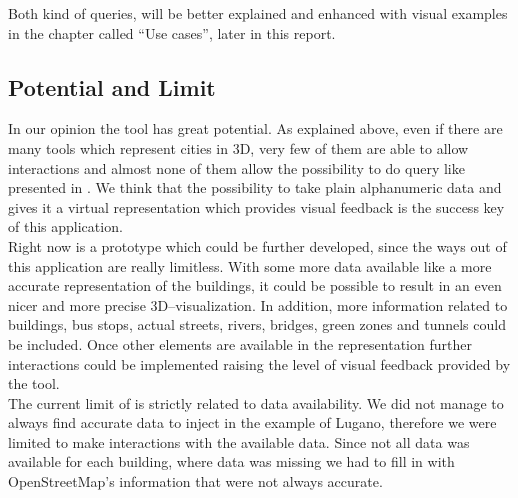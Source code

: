Both kind of queries, will be better explained and enhanced with visual examples in the chapter called ``Use cases'', later in this report. 
\subsection{Potential and Limit}
In our opinion the tool has great potential. As explained above, even if there are many tools which represent cities in 3D, very few of them are able to allow interactions and almost none of them allow the possibility to do query like presented in \applicationName. We think that the possibility to take plain alphanumeric data and gives it a virtual representation which provides visual feedback is the success key of this application.\\

Right now \applicationName is a prototype which could be further developed, since the ways out of this application are really limitless. With some more data available like a more accurate representation of the buildings, it could be possible to result in an even nicer and more precise 3D--visualization. In addition, more information related to buildings, bus stops, actual streets, rivers, bridges, green zones and tunnels could be included. Once other elements are available in the representation further interactions could be implemented raising the level of visual feedback provided by the tool.\\

The current limit of \applicationName is strictly related to data availability. We did not manage to always find accurate data to inject in the example of Lugano, therefore we were limited to make interactions with the available data. Since not all data was available for each building, where data was missing we had to fill in with OpenStreetMap's information that were not always accurate.